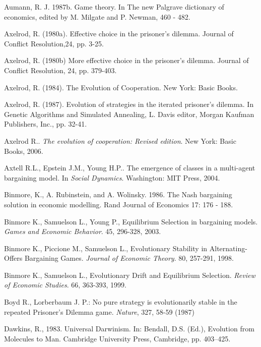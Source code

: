 \documentclass[12.5pt]{report}
\begin{document}
\begin{thebibliography}{}




 Aumann, R. J. 1987b. Game theory. In The new Palgrave dictionary of economics, edited by M. Milgate and P. Newman, 460 - 482.

 Axelrod, R. (1980a). Effective choice in the prisoner’s dilemma. Journal of Conflict Resolution,24, pp. 3-25.

 Axelrod, R. (1980b) More effective choice in the prisoner’s dilemma. Journal of Conflict Resolution, 24, pp. 379-403.

Axelrod, R. (1984). The Evolution of Cooperation. New York: Basic Books.

Axelrod, R. (1987). Evolution of strategies in the iterated prisoner’s dilemma. In Genetic Algorithms and Simulated Annealing, L. Davis
editor, Morgan Kaufman Publishers, Inc., pp. 32-41.

 Axelrod R.. {\emph{The evolution of cooperation: Revised edition}}. New York: Basic Books, 2006. 

 Axtell R.L., Epstein J.M., Young H.P.. {The emergence of classes in a multi-agent bargaining model. In \emph{Social Dynamics}}. Washington: MIT Press, 2004. 

Binmore, K., A. Rubinstein, and A. Wolinsky. 1986. The Nash bargaining solution in
economic modelling. Rand Journal of Economics 17: 176 - 188.

 Binmore K., Samuelson L., Young P., Equilibrium Selection in bargaining models. {\emph{Games and Economic Behavior}}. 45, 296-328, 2003. 

 Binmore K., Piccione M., Samuelson L., Evolutionary Stability in Alternating-Offers Bargaining Games. {\emph{Journal of Economic Theory}}. 80, 257-291, 1998. 

 Binmore K., Samuelson L., Evolutionary Drift and Equilibrium Selection. {\emph{Review of Economic Studies}}. 66, 363-393, 1999. 

 Boyd R., Lorberbaum J. P.: No pure strategy is evolutionarily stable in the repeated Prisoner's Dilemma game. \emph{Nature}, 327, 58-59 (1987)

Dawkins, R., 1983. Universal Darwinism. In: Bendall, D.S. (Ed.), Evolution from Molecules to Man. Cambridge University Press, Cambridge, pp. 403–425.


\end{thebibliography}
\end{document}

